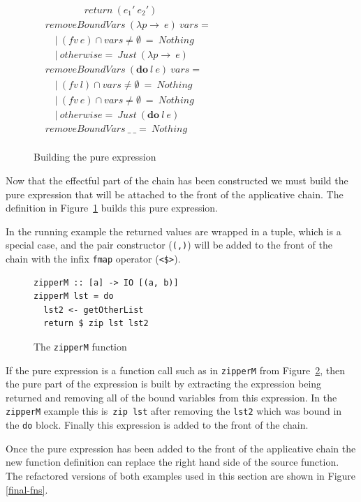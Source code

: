 \begin{figure}[h!]
\begin{math}
\begin{aligned}
&\qquad \qquad return\ (e_1'\ e_2')\\
&removeBoundVars\ (\lambda p \rightarrow\ e)\ vars =\\
&\quad |\ (fv\ e) \cap vars \neq \emptyset\ =\ Nothing\\
&\quad |\ otherwise =\ Just\ (\lambda p \rightarrow\ e)\\
&removeBoundVars\ (\textbf{do}\ l\ e)\ vars =\\
&\quad |\ (fv\ l) \cap vars \neq \emptyset\ =\ Nothing\\
&\quad |\ (fv\ e) \cap vars \neq \emptyset\ =\ Nothing\\
&\quad |\ otherwise =\ Just\ (\textbf{do}\ l\ e)\\
&removeBoundVars\ \_\ \_ =\ Nothing\\
\end{aligned}
\end{math}
\caption{Building the pure expression}
\label{pure}
\end{figure}
Now that the effectful part of the chain has been constructed we must build the pure expression that will be attached to the front of the applicative chain. The definition in Figure~\ref{pure} builds this pure expression. 

In the running example the returned values are wrapped in a tuple, which is a special case, and the pair constructor (\texttt{(,)}) will be added to the front of the chain with the infix \texttt{fmap} operator (\texttt{<\$>}).

\begin{figure}[t]
\begin{lstlisting}
zipperM :: [a] -> IO [(a, b)]
zipperM lst = do
  lst2 <- getOtherList
  return $ zip lst lst2
\end{lstlisting}
\caption{The \texttt{zipperM} function}
\label{zipperM}
\end{figure}

If the pure expression is a function call such as in \texttt{zipperM} from Figure~\ref{zipperM}, then the pure part of the expression is built by extracting the expression being returned and removing all of the bound variables from this expression. In the \texttt{zipperM} example this is~\texttt{zip lst} after removing the \texttt{lst2} which was bound in the \texttt{do} block. Finally this expression is added to the front of the chain.

Once the pure expression has been added to the front of the applicative chain the new function definition can replace the right hand side of the source function. The refactored versions of both examples used in this section are shown in Figure \ref{final-fns}.

